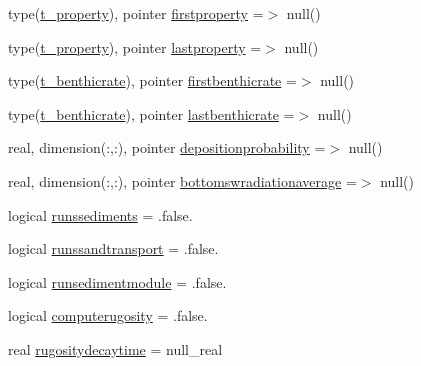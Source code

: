 \begin{DoxyCompactItemize}
\item 
type(\mbox{\hyperlink{structmoduleinterfacesedimentwater_1_1t__property}{t\+\_\+property}}), pointer \mbox{\hyperlink{structmoduleinterfacesedimentwater_1_1t__interfacesedimentwater_a6838638eef868bcf6e44d8b5f1cdb465}{firstproperty}} =$>$ null()
\item 
type(\mbox{\hyperlink{structmoduleinterfacesedimentwater_1_1t__property}{t\+\_\+property}}), pointer \mbox{\hyperlink{structmoduleinterfacesedimentwater_1_1t__interfacesedimentwater_a910840c15836fe4fd24ac0470b6cd3e8}{lastproperty}} =$>$ null()
\item 
type(\mbox{\hyperlink{structmoduleinterfacesedimentwater_1_1t__benthicrate}{t\+\_\+benthicrate}}), pointer \mbox{\hyperlink{structmoduleinterfacesedimentwater_1_1t__interfacesedimentwater_aa8b448a73f0a9b83e7ccee46c2806943}{firstbenthicrate}} =$>$ null()
\item 
type(\mbox{\hyperlink{structmoduleinterfacesedimentwater_1_1t__benthicrate}{t\+\_\+benthicrate}}), pointer \mbox{\hyperlink{structmoduleinterfacesedimentwater_1_1t__interfacesedimentwater_a2dbddce57481d8d17ab5aaea79619d22}{lastbenthicrate}} =$>$ null()
\item 
real, dimension(\+:,\+:), pointer \mbox{\hyperlink{structmoduleinterfacesedimentwater_1_1t__interfacesedimentwater_ab660f08bba6a1e7d10f3f43d89433566}{depositionprobability}} =$>$ null()
\item 
real, dimension(\+:,\+:), pointer \mbox{\hyperlink{structmoduleinterfacesedimentwater_1_1t__interfacesedimentwater_a07c7ae65a42935eca3b3693f3219e9e7}{bottomswradiationaverage}} =$>$ null()
\item 
logical \mbox{\hyperlink{structmoduleinterfacesedimentwater_1_1t__interfacesedimentwater_aad2b5048a7c2ccfc46c5e26fe4ad420b}{runssediments}} = .false.
\item 
logical \mbox{\hyperlink{structmoduleinterfacesedimentwater_1_1t__interfacesedimentwater_a3e04ea8d7d6f44faa3f099ecaa7e6d19}{runssandtransport}} = .false.
\item 
logical \mbox{\hyperlink{structmoduleinterfacesedimentwater_1_1t__interfacesedimentwater_a54d0f28edcb303d538f4440bd3b3c6e3}{runsedimentmodule}} = .false.
\item 
logical \mbox{\hyperlink{structmoduleinterfacesedimentwater_1_1t__interfacesedimentwater_a54c3611469ac22fcd6c215ad9dd68063}{computerugosity}} = .false.
\item 
real \mbox{\hyperlink{structmoduleinterfacesedimentwater_1_1t__interfacesedimentwater_a8c17debed49cbc24979f213b55489744}{rugositydecaytime}} = null\+\_\+real

\end{DoxyCompactItemize}
